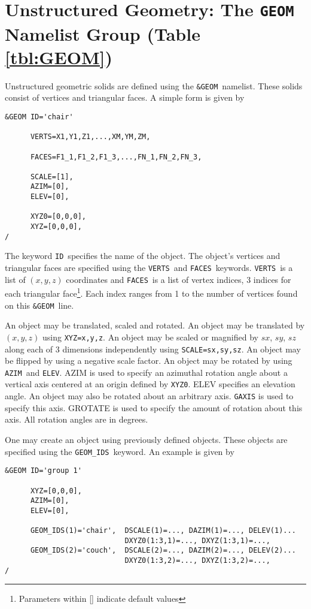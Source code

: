 \documentclass[12pt]{article}
\begin{document}
\vspace{1.0in}
\section{Unstructured Geometry: The \texorpdfstring{{\tt GEOM}}{GEOM} Namelist Group (Table \ref{tbl:GEOM})}
\label{info:GEOM}

Unstructured geometric solids are defined using the {\tt \&GEOM}\ namelist. These solids consist of vertices and triangular faces.
A simple form is given by

\begin{verbatim}
&GEOM ID='chair'

      VERTS=X1,Y1,Z1,...,XM,YM,ZM,

      FACES=F1_1,F1_2,F1_3,...,FN_1,FN_2,FN_3,

      SCALE=[1],
      AZIM=[0],
      ELEV=[0],

      XYZ0=[0,0,0],
      XYZ=[0,0,0],
/
\end{verbatim}

\noindent The keyword {\tt ID}\ specifies the name of the object.  The object's vertices and triangular faces are specified using the {\tt VERTS}\ and {\tt FACES}\ keywords.  {\tt VERTS}\ is a list of $(x,y,z)$ coordinates and {\tt FACES}\ is a list of vertex indices, 3 indices for each triangular face\footnote{Parameters within [] indicate default values}.  Each index ranges from 1 to the number of vertices found on this {\tt \&GEOM}\ line.

An object may be translated, scaled and rotated.  An object may be translated by $(x,y,z)$ using {\tt XYZ=x,y,z}.  An object may be scaled or magnified by $sx$, $sy$, $sz$ along each of 3 dimensions independently using {\tt SCALE=sx,sy,sz}. An object may be flipped by using a negative scale factor.  An object may be rotated by using {\tt AZIM}\ and {\tt ELEV}.  AZIM is used to specify an azimuthal rotation angle about a vertical axis centered at an origin defined by {\tt XYZ0}.  ELEV specifies an elevation angle.  An object may also be rotated about an arbitrary axis.  {\tt GAXIS} is used to specify this axis.  GROTATE is used to specify the amount of rotation about this axis.  All rotation angles are in degrees.

One may create an object using previously defined objects. These objects are specified using the {\tt GEOM\_IDS}\ keyword.  An example is given by

{%
\begin{verbatim}
&GEOM ID='group 1'

      XYZ=[0,0,0],
      AZIM=[0],
      ELEV=[0],

      GEOM_IDS(1)='chair',  DSCALE(1)=..., DAZIM(1)=..., DELEV(1)...
                            DXYZ0(1:3,1)=..., DXYZ(1:3,1)=...,
      GEOM_IDS(2)='couch',  DSCALE(2)=..., DAZIM(2)=..., DELEV(2)...
                            DXYZ0(1:3,2)=..., DXYZ(1:3,2)=...,
/
\end{verbatim}
}
\end{document}
